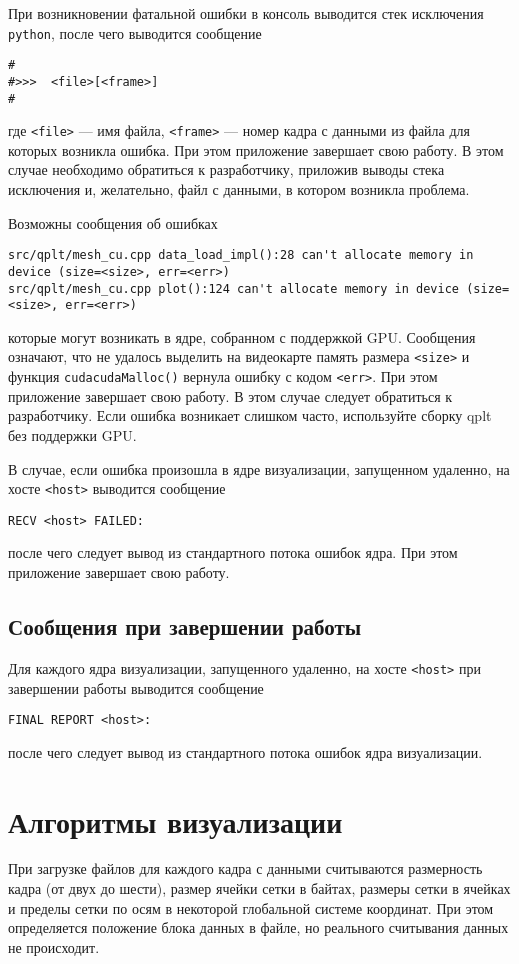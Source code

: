 \documentclass[12pt]{article}
\begin{document}
При возникновении фатальной ошибки в консоль выводится стек исключения \verb'python',
после чего выводится сообщение
\begin{verbatim}
#
#>>>  <file>[<frame>]
#
\end{verbatim}
где \verb'<file>' --- имя файла, \verb'<frame>' --- номер кадра с данными из файла для которых возникла ошибка.
При этом приложение завершает свою работу.
В этом случае необходимо обратиться к разработчику, приложив выводы стека исключения
и, желательно, файл с данными, в котором возникла проблема.

Возможны сообщения об ошибках
\begin{verbatim}
src/qplt/mesh_cu.cpp data_load_impl():28 can't allocate memory in device (size=<size>, err=<err>)
src/qplt/mesh_cu.cpp plot():124 can't allocate memory in device (size=<size>, err=<err>)
\end{verbatim}
которые могут возникать в ядре, собранном с поддержкой GPU. Сообщения означают, что не удалось выделить на видеокарте память размера \verb'<size>'
и функция \verb'cudacudaMalloc()' вернула ошибку с кодом \verb'<err>'. При этом приложение завершает свою работу.
В этом случае следует обратиться к разработчику. Если ошибка возникает слишком часто, используйте сборку qplt без поддержки GPU.

В случае, если ошибка произошла в ядре визуализации, запущенном удаленно, на хосте \verb'<host>' выводится сообщение
\begin{verbatim}
RECV <host> FAILED:
\end{verbatim}
после чего следует вывод из стандартного потока ошибок ядра. При этом приложение завершает свою работу.

\subsection{Сообщения при завершении работы}
Для каждого ядра визуализации, запущенного удаленно, на хосте \verb'<host>' при завершении работы выводится сообщение
\begin{verbatim}
FINAL REPORT <host>:
\end{verbatim}
после чего следует вывод из стандартного потока ошибок ядра визуализации. 

\section{Алгоритмы визуализации}
При загрузке файлов для каждого кадра с данными считываются размерность кадра (от двух до шести), размер ячейки сетки в байтах, размеры сетки в ячейках
и пределы сетки по осям в некоторой глобальной системе координат. При этом определяется положение блока данных в файле, но реального считывания данных не происходит.
\end{document}
